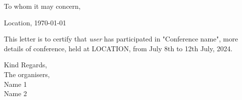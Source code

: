 \documentclass[11pt,english]{letter}
\begin{document}
To whom it may concern,

\begin{flushright}
	Location, \today
\end{flushright}

This letter is to certify that \textit{{user}} has participated in  "Conference name",
more details of conference,
held at LOCATION, from July 8th to 12th July, 2024.

Kind Regards, \\
The organisers, \\
Name 1\\
Name 2
\end{document}
